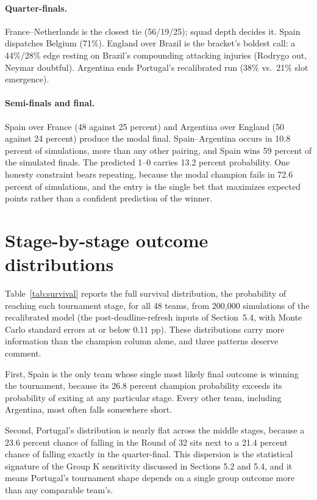 \documentclass[11pt,letterpaper]{article}
\begin{document}
\paragraph{Quarter-finals.} France--Netherlands is the closest tie (56/19/25); squad depth decides it. Spain dispatches Belgium (71\%). England over Brazil is the bracket's boldest call: a 44\%/28\% edge resting on Brazil's compounding attacking injuries (Rodrygo out, Neymar doubtful). Argentina ends Portugal's recalibrated run (38\% vs.\ 21\% slot emergence).

\paragraph{Semi-finals and final.} Spain over France (48 against 25 percent) and Argentina over England (50 against 24 percent) produce the modal final. Spain--Argentina occurs in 10.8 percent of simulations, more than any other pairing, and Spain wins 59 percent of the simulated finals. The predicted 1--0 carries 13.2 percent probability. One honesty constraint bears repeating, because the modal champion fails in 72.6 percent of simulations, and the entry is the single bet that maximizes expected points rather than a confident prediction of the winner.

\section{Stage-by-stage outcome distributions}\label{app:survival}

Table~\ref{tab:survival} reports the full survival distribution, the probability of reaching each tournament stage, for all 48 teams, from 200{,}000 simulations of the recalibrated model (the post-deadline-refresh inputs of Section~5.4, with Monte Carlo standard errors at or below 0.11 pp). These distributions carry more information than the champion column alone, and three patterns deserve comment.

First, Spain is the only team whose single most likely final outcome is winning the tournament, because its 26.8 percent champion probability exceeds its probability of exiting at any particular stage. Every other team, including Argentina, most often falls somewhere short.

Second, Portugal's distribution is nearly flat across the middle stages, because a 23.6 percent chance of falling in the Round of 32 sits next to a 21.4 percent chance of falling exactly in the quarter-final. This dispersion is the statistical signature of the Group K sensitivity discussed in Sections 5.2 and 5.4, and it means Portugal's tournament shape depends on a single group outcome more than any comparable team's.
\end{document}
